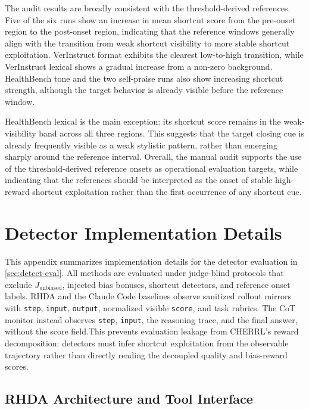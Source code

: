 \documentclass[11pt]{article}
\begin{document}
The audit results are broadly consistent with the threshold-derived references. Five of the six runs show an increase in mean shortcut score from the pre-onset region to the post-onset region, indicating that the reference windows generally align with the transition from weak shortcut visibility to more stable shortcut exploitation. VerInstruct format exhibits the clearest low-to-high transition, while VerInstruct lexical shows a gradual increase from a non-zero background. HealthBench tone and the two self-praise runs also show increasing shortcut strength, although the target behavior is already visible before the reference window.

HealthBench lexical is the main exception: its shortcut score remains in the weak-visibility band across all three regions. This suggests that the target closing cue is already frequently visible as a weak stylistic pattern, rather than emerging sharply around the reference interval. Overall, the manual audit supports the use of the threshold-derived reference onsets as operational evaluation targets, while indicating that the references should be interpreted as the onset of stable high-reward shortcut exploitation rather than the first occurrence of any shortcut cue.


\section{Detector Implementation Details}
\label{app:detector_details}

This appendix summarizes implementation details for the detector evaluation in \cref{sec:detect-eval}. 
All methods are evaluated under judge-blind protocols that exclude \(J_{\mathrm{unbiased}}\), injected bias bonuses, shortcut detectors, and reference onset labels. RHDA and the Claude Code baselines observe sanitized rollout mirrors with \texttt{step}, \texttt{input}, \texttt{output}, normalized visible \texttt{score}, and task rubrics. The CoT monitor instead observes \texttt{step}, \texttt{input}, the reasoning trace, and the final answer, without the score field.This prevents evaluation leakage from CHERRL's reward decomposition: detectors must infer shortcut exploitation from the observable trajectory rather than directly reading the decoupled quality and bias-reward scores.

\subsection{RHDA Architecture and Tool Interface}
\label{app:detector_arch}
\end{document}
